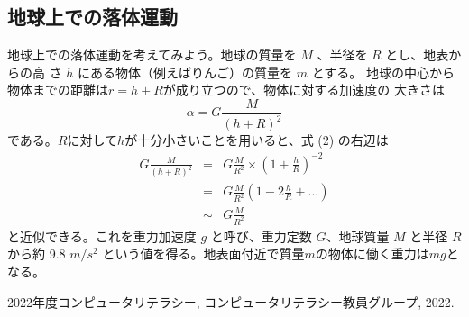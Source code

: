 \documentclass[platex,a4paper,12pt,dvipdfmx]{jsarticle}
\begin{document}
\subsection{地球上での落体運動}
地球上での落体運動を考えてみよう。地球の質量を $M$ 、半径を $R$ とし、地表からの高
さ $h$ にある物体（例えばりんご）の質量を $m$ とする。
地球の中心から物体までの距離は$r = h + R$が成り立つので、物体に対する加速度の
大きさは\begin{equation}\alpha = G\frac{M}{(h+R)^2}\end{equation}
である。$R$に対して$h$が十分小さいことを用いると、式 (2) の右辺は
\begin{eqnarray}G\frac{M}{(h+R)^2} &=& G\frac{M}{R^2}\times(1+\frac{h}{R})^{-2}\\ 
                                   &=& G\frac{M}{R^2}(1-2\frac{h}{R}+...)\\
                                &\sim&G\frac{M}{R^2}
                                \end{eqnarray}と近似できる。これを重力加速度 $g$ と呼び、重力定数 $G$、地球質量 $M$ と半径 $R$ から約
9.8 $m/s^2$ という値を得る。地表面付近で質量$m$の物体に働く重力は$mg$となる。
\begin{thebibliography}{99}
 2022年度コンピュータリテラシー, コンピュータリテラシー教員グループ, 2022.
\end{thebibliography}
\end{document}
